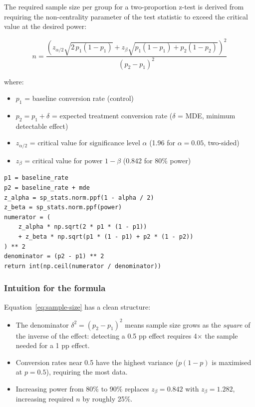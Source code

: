 The required sample size per group for a two-proportion z-test is derived from
requiring the non-centrality parameter of the test statistic to exceed the
critical value at the desired power:

\begin{equation}
  n = \frac{\left(z_{\alpha/2}\sqrt{2\, p_1(1-p_1)}
    + z_\beta \sqrt{p_1(1-p_1) + p_2(1-p_2)}\right)^2}{(p_2 - p_1)^2}
  \label{eq:sample-size}
\end{equation}

where:
\begin{itemize}
  \item $p_1$ = baseline conversion rate (control)
  \item $p_2 = p_1 + \delta$ = expected treatment conversion rate
    ($\delta$ = MDE, minimum detectable effect)
  \item $z_{\alpha/2}$ = critical value for significance level $\alpha$
    (1.96 for $\alpha = 0.05$, two-sided)
  \item $z_\beta$ = critical value for power $1 - \beta$
    (0.842 for 80\% power)
\end{itemize}

\begin{lstlisting}[style=python, caption={required\_sample\_size (stats\_engine.py lines 262--272)}]
p1 = baseline_rate
p2 = baseline_rate + mde
z_alpha = sp_stats.norm.ppf(1 - alpha / 2)
z_beta = sp_stats.norm.ppf(power)
numerator = (
    z_alpha * np.sqrt(2 * p1 * (1 - p1))
    + z_beta * np.sqrt(p1 * (1 - p1) + p2 * (1 - p2))
) ** 2
denominator = (p2 - p1) ** 2
return int(np.ceil(numerator / denominator))
\end{lstlisting}

\subsubsection{Intuition for the formula}

Equation~\eqref{eq:sample-size} has a clean structure:
\begin{itemize}
  \item The denominator $\delta^2 = (p_2 - p_1)^2$ means sample size grows
    as the \emph{square} of the inverse of the effect: detecting a 0.5 pp
    effect requires 4$\times$ the sample needed for a 1 pp effect.
  \item Conversion rates near 0.5 have the highest variance
    ($p(1-p)$ is maximised at $p = 0.5$), requiring the most data.
  \item Increasing power from 80\% to 90\% replaces $z_\beta = 0.842$ with
    $z_\beta = 1.282$, increasing required $n$ by roughly 25\%.
\end{itemize}

